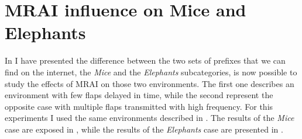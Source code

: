 %

\section{MRAI influence on Mice and Elephants}
\label{sec:bgp_rfd_mrai_influence_mice_elephants}

In  I have presented the difference between the
two sets of prefixes that we can find on the internet, the \textit{Mice} and the
\textit{Elephants} subcategories, is now possible to study the effects of \ac{MRAI}
on those two environments.
The first one describes an environment with few flaps delayed in time, while the
second represent the opposite case with multiple flaps transmitted with high
frequency.
For this experiments I used the same environments described in .
The results of the \textit{Mice} case are exposed in ,
while the results of the \textit{Elephants} case are presented in .

